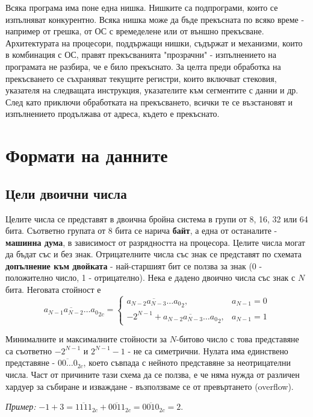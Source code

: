 \documentclass[fleqn,12pt]{article}
\begin{document}
Всяка програма има поне една нишка. Нишките са подпрограми, които се изпълняват конкурентно. Всяка нишка може да 
бъде прекъсната по всяко време - например от грешка, от ОС с времеделене или от външно прекъсване.
Архитектурата на процесори, поддържащи нишки, съдържат и механизми, които в комбинация с ОС, правят прекъсванията
"прозрачни" - изпълнението на програмата не разбира, че е било прекъснато. За целта преди обработка на прекъсването се съхраняват
текущите регистри, които включват стековия, указателя на следващата инструкция, указателите към сегментите с данни и др.
След като приключи обработката на прекъсването, всички те се възстановят и изпълнението продължава от адреса, където е прекъснато.

\section{Формати на данните}

\subsection{Цели двоични числа}
\label{subsection:integers}
Целите числа се представят в двоична бройна система в групи от 8, 16, 32 или 64 бита. Съответно групата от 8 бита се нарича \textbf{байт},
а една от останалите - \textbf{машинна дума}, в зависимост от разрядността на процесора. Целите числа могат да бъдат със и без знак.
Отрицателните числа със знак се представят по схемата \textbf{допълнение към двойката} - най-старшият бит се ползва за знак (0 - положително число, 1 - отрицателно).
Нека е дадено двоично числа със знак с $N$ бита. Неговата стойност е
\[ \overline{a_{N-1} a_{N-2} \dots a_0}_{2c} = \begin{cases}
    \overline{a_{N-2} a_{N-3} \dots a_0}_2, & a_{N-1} = 0 \\
    -2^{N-1} + \overline{a_{N-2} a_{N-3} \dots a_0}_2, & a_{N-1} = 1
\end{cases}
\]

Минималните и максималните стойности за $N$-битово число с това представяне са съответно $-2^{N-1}$ и $2^{N-1} - 1$ - не са симетрични. 
Нулата има единствено представяне - $\overline{00\dots0}_{2c}$, което съвпада с нейното представяне за неотрицателни числа.
Част от причините тази схема да се ползва, е че няма нужда от различен хардуер за събиране и изваждане - възползваме се от превъртането (overflow).

\textit{Пример: } $-1 + 3 = \overline{1111}_{2c} + \overline{0011}_{2c} = \overline{0010}_{2c} = 2$. 
\end{document}
